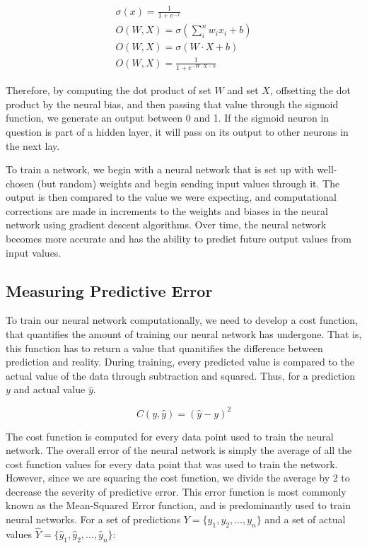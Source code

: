 \begin{gather*}
    \sigma (x)=\frac{1}{1+e^{-x}}\\
    O(W, X)=\sigma \left(\sum_{i}^{n} w_{i}x_{i} + b\right)\\
    O(W, X)=\sigma \left(W\cdot X + b\right)\\
    O(W, X)=\frac{1}{1+e^{-W\cdot X - b}}
\end{gather*}

Therefore, by computing the dot product of set $W$ and set $X$, offsetting the dot product by the neural bias, and then passing that value through the sigmoid function, we generate an output between 0 and 1.
If the sigmoid neuron in question is part of a hidden layer, it will pass on its output to other neurons in the next lay. 

To train a network, we begin with a neural network that is set up with well-chosen (but random) weights and begin sending input values through it.
The output is then compared to the value we were expecting, and computational corrections are made in increments to the weights and biases in the neural network using gradient descent algorithms.
Over time, the neural network becomes more accurate and has the ability to predict future output values from input values.

\subsection{Measuring Predictive Error}

To train our neural network computationally, we need to develop a cost function, that quantifies the amount of training our neural network has undergone.
That is, this function has to return a value that quanitifies the difference between prediction and reality.
During training, every predicted value is compared to the actual value of the data through subtraction and squared.
Thus, for a prediction $y$ and actual value $\hat y$.

\[
C(y,\hat y)=(\hat y - y)^2
\]

The cost function is computed for every data point used to train the neural network.
The overall error of the neural network is simply the average of all the cost function values for every data point that was used to train the network.
However, since we are squaring the cost function, we divide the average by 2 to decrease the severity of predictive error.
This error function is most commonly known as the Mean-Squared Error function, and is predominantly used to train neural networks.
For a set of predictions $Y=\{y_1,y_2,\hdots,y_n\}$ and a set of actual values $\hat Y=\{\hat y_1,\hat y_2,\hdots,\hat y_n\}$:

